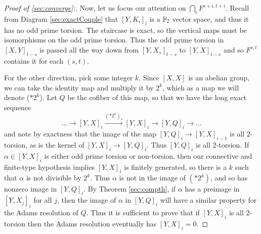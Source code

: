 \begin{proof}[Proof of \ref{sec:converge}:]

Now, let us focus our attention on $\bigcap_i F^{s+i,t+i}$.  
Recall from Diagram \ref{sec:exactCouple} that $[Y,K_i]_{l}$ is a $\mathbb{F}_2$ vector space, and thus it has no odd prime torsion.
The staircase is exact, so the vertical maps must be isomorphisms on the odd prime torsion. 
Thus the odd prime torsion in $[X,Y]_{t-s}$ is passed all the way down from $[Y,X_s]_{t-s}$ to $[Y,X]_{t-s}$ and so $F^{s,t}$ contains it for each $(s,t)$.

For the other direction, pick some integer $k$.  
Since $[X,X]$ is an abelian group, we can take the identity map and multiply it by $2^k$, which as a map we will denote ($*2^k$).
Let $Q$ be the cofiber of this map, so that we have the long exact sequence
\[...\to [Y,X]_i\xrightarrow{(*2^k)_*} [Y,X]_i \to [Y,Q]_i\to ...\]
and note by exactness that the image of the map $[Y,Q]_i\to [Y,X]_{i-1}$ is all $2$-torsion, as is the kernel of $[Y,X]_i\to [Y,Q]_i$.  Thus $[Y,Q]_i$ is all 2-torsion.
If $\alpha\in [Y,X]_i$ is either odd prime torsion or non-torsion, then our connective and finite-type hypothesis implies $[Y,X]_i$ is finitely generated, so there is a $k$ such that $\alpha$ is not divisible by $2^k$.  
Thus $\alpha$ is not in the image of $(*2^k)$, and so has nonzero image in $[Y,Q]_i$.  
By Theorem \ref{sec:compth}, if $\alpha$ has a preimage in $[Y,X_j]_i$ for all $j$, then the image of $\alpha$ in $[Y,Q]_i$ will have a similar property for the Adams resolution of $Q$.  
Thus it is sufficient to prove that if $[Y,X]_i$ is all 2-torsion then the Adams resolution eventually has $[Y,X]_i=0$.  


\end{proof}
